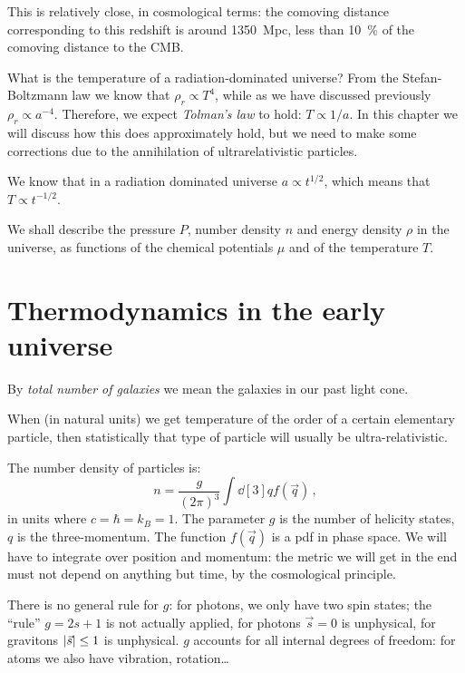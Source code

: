 \documentclass[main.tex]{subfiles}
\begin{document}
This is relatively close, in cosmological terms: the comoving distance corresponding to this redshift is around \SI{1350}{Mpc}, less than \SI{10}{\percent} of the comoving distance to the CMB. 


What is the temperature of a radiation-dominated universe?
From the Stefan-Boltzmann law we know that \(\rho _r \propto T^{4}\), while as we have discussed previously \(\rho _r \propto a^{-4}\).
Therefore, we expect \emph{Tolman's law} to hold: \(T \propto 1/a\).
In this chapter we will discuss how this does approximately hold, but we need to make some corrections due to the annihilation of ultrarelativistic particles.

We know that in a radiation dominated universe \(a \propto t^{1/2}\), which means that \(T \propto t^{-1/2}\).

We shall describe the pressure \(P\), number density \(n\) and energy density \(\rho  \) in the universe, as functions of the chemical potentials \(\mu \) and of  the temperature \(T\).

\section{Thermodynamics in the early universe}

By \emph{total number of galaxies} we mean the galaxies in our past light cone.

When (in natural units) we get temperature of the order of a certain elementary particle, then statistically that type of particle will usually be ultra-relativistic.

The number density of particles is: 
%
\begin{equation}
  n = \frac{g}{(2 \pi )^3} \int \dd[3]{q} f(\vec{q})
\,,
\end{equation}
%
in units where \(c= \hbar = k_B = 1\). The parameter \(g\) is the number of helicity states, \(q\) is the three-momentum. The function \(f(\vec{q})\) is a pdf in phase space.
We will have to integrate  over position and momentum: the metric we will get in the end must not depend on anything but time, by the cosmological principle.

There is no general rule for \(g\): for photons, we only have two spin states; the ``rule'' \(g = 2s +1 \) is not actually applied, for photons \(\vec{s} = 0\) is unphysical, for gravitons \(\abs{\vec{s}} \leq 1 \) is unphysical.
\(g\) accounts for all internal degrees of freedom: for atoms we also have vibration, rotation\dots
\end{document}
